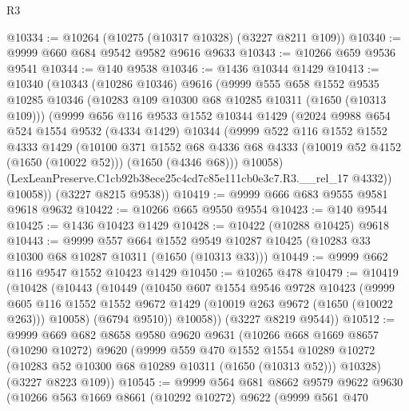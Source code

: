 \begin{lexlean}{R3}
\begin{coremodule}
@10334 := @10264 (@10275 (@10317 @10328) (@3227 @8211 @109))
@10340 := @9999 @660 @684 @9542 @9582 @9616 @9633
@10343 := @10266 @659 @9536 @9541
@10344 := @140 @9538
@10346 := @1436 @10344 @1429
@10413 := @10340
    (@10343
      (@10286 @10346)
      @9616
      (@9999
        @555
        @658
        @1552
        @9535
        @10285
        @10346
        (@10283 @109 @10300 @68 @10285 @10311 (@1650 (@10313 @109)))
        (@9999
          @656
          @116
          @9533
          @1552
          @10344
          @1429
          (@2024
            @9988
            @654
            @524
            @1554
            @9532
            (@4334 @1429)
            @10344
            (@9999
              @522
              @116
              @1552
              @1552
              @4333
              @1429
              (@10100
                @371
                @1552
                @68
                @4336
                @68
                @4333
                (@10019 @52 @4152 (@1650 (@10022 @52)))
                (@1650 (@4346 @68)))
              @10058)
            (LexLeanPreserve.C1cb92b38ece25c4cd7c85e111cb0e3c7.R3.__rel_17 @4332))
          @10058))
      (@3227 @8215 @9538))
@10419 := @9999 @666 @683 @9555 @9581 @9618 @9632
@10422 := @10266 @665 @9550 @9554
@10423 := @140 @9544
@10425 := @1436 @10423 @1429
@10428 := @10422 (@10288 @10425) @9618
@10443 := @9999
    @557
    @664
    @1552
    @9549
    @10287
    @10425
    (@10283 @33 @10300 @68 @10287 @10311 (@1650 (@10313 @33)))
@10449 := @9999 @662 @116 @9547 @1552 @10423 @1429
@10450 := @10265 @478
@10479 := @10419
    (@10428
      (@10443
        (@10449
          (@10450
            @607
            @1554
            @9546
            @9728
            @10423
            (@9999
              @605
              @116
              @1552
              @1552
              @9672
              @1429
              (@10019 @263 @9672 (@1650 (@10022 @263)))
              @10058)
            (@6794 @9510))
          @10058))
      (@3227 @8219 @9544))
@10512 := @9999
    @669
    @682
    @8658
    @9580
    @9620
    @9631
    (@10266
      @668
      @1669
      @8657
      (@10290 @10272)
      @9620
      (@9999
        @559
        @470
        @1552
        @1554
        @10289
        @10272
        (@10283 @52 @10300 @68 @10289 @10311 (@1650 (@10313 @52)))
        @10328)
      (@3227 @8223 @109))
@10545 := @9999
    @564
    @681
    @8662
    @9579
    @9622
    @9630
    (@10266
      @563
      @1669
      @8661
      (@10292 @10272)
      @9622
      (@9999
        @561
        @470

\end{coremodule}
\end{lexlean}
